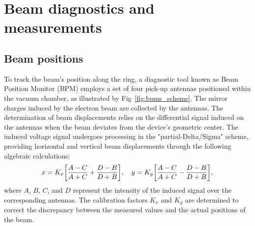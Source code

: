 


\section{Beam diagnostics and measurements}
\subsection{Beam positions}
To track the beam's position along the ring, a diagnostic tool known as Beam Position Monitor (BPM) employs a set of four pick-up antennas positioned within the vacuum chamber, as illustrated by Fig~\ref{fig:bpms_scheme}. The mirror charges induced by the electron beam are collected by the antennas. The determination of beam displacements relies on the differential signal induced on the antennas when the beam deviates from the device's geometric center. The induced voltage signal undergoes processing in the "partial-Delta/Sigma" scheme, providing horizontal and vertical beam displacements through the following algebraic calculations:
\begin{equation}
    x = K_x \qty[\frac{A-C}{A+C}+\frac{D - B}{D+B}], \quad y = K_y \qty[\frac{A-C}{A+C}-\frac{D - B}{D+B}],
\end{equation}
where $A$, $B$, $C$, and $D$ represent the intensity of the induced signal over the corresponding antennas. The calibration factors $K_x$ and $K_y$ are determined to correct the discrepancy between the measured values and the actual positions of the beam. 

